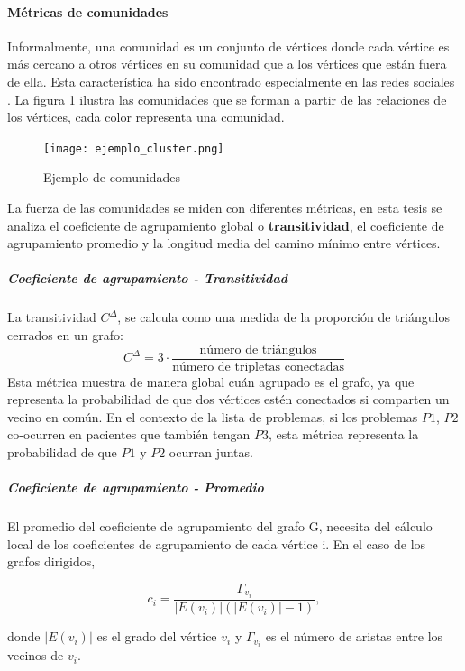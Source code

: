 \paragraph{Métricas de comunidades}
\label{par:efecto-comunidades}
Informalmente, una comunidad es un conjunto de vértices donde cada vértice es más cercano a otros vértices en su comunidad que a los vértices que están fuera de ella. Esta característica ha sido encontrado especialmente en las redes sociales \cite{Tang2010}. La figura \ref{fig:ejemploCluster} ilustra las comunidades que se forman a partir de las relaciones de los vértices, cada color representa una comunidad.

\begin{figure}
\caption{Ejemplo de comunidades}
\label{fig:ejemploCluster}
\centering
\texttt{[image: ejemplo\_cluster.png]}
\end{figure}

La fuerza de las comunidades se miden con diferentes métricas, en esta tesis se analiza el coeficiente de agrupamiento global o \textbf{transitividad}, el coeficiente de agrupamiento promedio y la longitud media del camino mínimo entre vértices. 

\subparagraph{Coeficiente de agrupamiento - Transitividad}
La transitividad \cite{Wasserman1994} $C^{\Delta}$, se calcula como una medida de la proporción de triángulos cerrados en un grafo:
\begin{equation}
\label{equ:coeficiente_transitividad}
C^{\Delta} =3\cdot\frac{\text{número de triángulos}}{\text{número de tripletas conectadas}}
\end{equation}
Esta métrica muestra de manera global cuán agrupado es el grafo, ya que representa la probabilidad de que dos vértices estén conectados si comparten un vecino en común. En el contexto de la lista de problemas, si los problemas $P1$, $P2$ co-ocurren en pacientes que también tengan $P3$, esta métrica representa la probabilidad de que $P1$ y $P2$ ocurran juntas.

\subparagraph{Coeficiente de agrupamiento - Promedio}\cite{Saramaki2006,Kaiser2008}
El promedio del coeficiente de agrupamiento del grafo G, necesita del cálculo local de los coeficientes de agrupamiento de cada vértice i. En el caso de los grafos dirigidos,

\begin{equation}
c_{i} = \frac{\Gamma_{v_{i}}}{|E(v_{i})|(|E(v_{i})|-1)},
\end{equation}

donde $|E(v_{i})|$ es el grado del vértice $v_{i}$ y $\Gamma_{v_{i}}$ es el número de aristas entre los vecinos de $v_{i}$.

